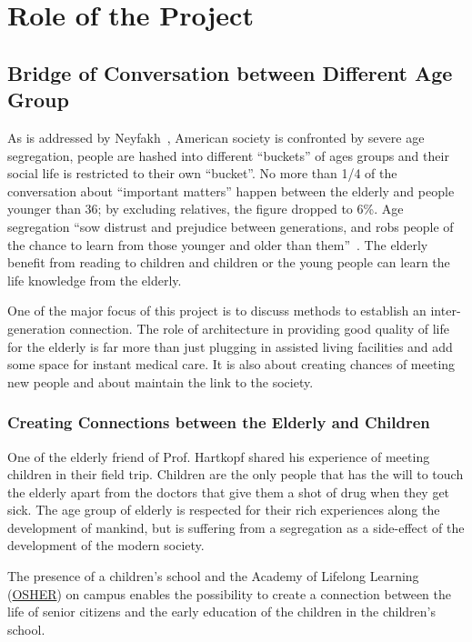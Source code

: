 \section{Role of the Project}
\subsection{Bridge of Conversation between Different Age Group}
As is addressed by Neyfakh~\cite{Neyfakh2014}, American society is
confronted by severe age segregation, people are hashed into different
``buckets'' of ages groups and their social life is restricted to
their own ``bucket''. No more than 1/4 of the conversation about
``important matters'' happen between the elderly and people younger
than 36; by excluding relatives, the figure dropped to 6\%. Age
segregation ``sow distrust and prejudice between generations, and robs
people of the chance to learn from those younger and older than
them''~\cite{Neyfakh2014}.  The elderly benefit from reading to
children and children or the young people can learn the life knowledge
from the elderly.

One of the major focus of this project is to discuss methods to
establish an inter-generation connection. The role of architecture in
providing good quality of life for the elderly is far more than just
plugging in assisted living facilities and add some space for instant
medical care. It is also about creating chances of meeting new people
and about maintain the link to the society.

\subsubsection{Creating Connections between the Elderly and Children}
One of the elderly friend of Prof. Hartkopf shared his experience of
meeting children in their field trip. Children are the only people
that has the will to touch the elderly apart from the doctors that
give them a shot of drug when they get sick. The age group of elderly
is respected for their rich experiences along the development of
mankind, but is suffering from a segregation as a side-effect of the
development of the modern society.

The presence of a children’s school and the Academy of Lifelong
Learning (\href{http://www.cmu.edu/osher/}{OSHER}) on campus enables
the possibility to create a connection between the life of senior
citizens and the early education of the children in the children's
school.

